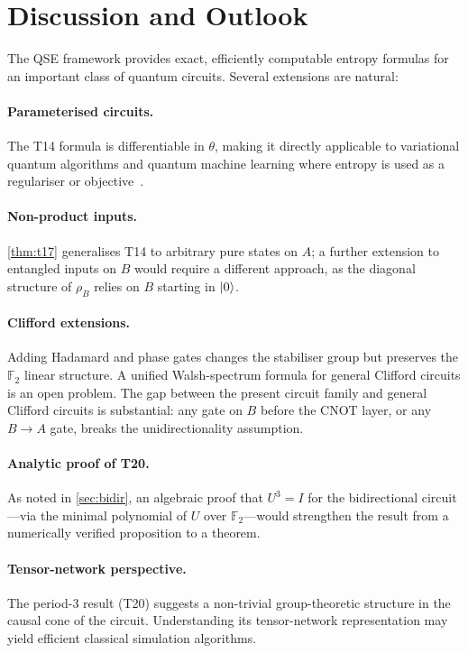 \documentclass[11pt,a4paper]{article}
\newcommand{\F}{\mathbb{F}}
\begin{document}
\section{Discussion and Outlook}
\label{sec:discussion}

The QSE framework provides exact, efficiently computable entropy formulas for
an important class of quantum circuits.  Several extensions are natural:

\paragraph{Parameterised circuits.}
The T14 formula is differentiable in $\theta$, making it directly applicable
to variational quantum algorithms and quantum machine learning where entropy
is used as a regulariser or objective~\cite{cerezo2021variational}.

\paragraph{Non-product inputs.}
\cref{thm:t17} generalises T14 to arbitrary pure states on $A$; a further
extension to entangled inputs on $B$ would require a different approach, as
the diagonal structure of $\rho_B$ relies on $B$ starting in $\ket{0}$.

\paragraph{Clifford extensions.}
Adding Hadamard and phase gates changes the stabiliser group but preserves
the $\F_2$ linear structure.  A unified Walsh-spectrum formula for general
Clifford circuits is an open problem.  The gap between the present circuit
family and general Clifford circuits is substantial: any gate on $B$ before
the CNOT layer, or any $B \to A$ gate, breaks the unidirectionality assumption.

\paragraph{Analytic proof of T20.}
As noted in \cref{sec:bidir}, an algebraic proof that $U^3 = I$ for the
bidirectional circuit---via the minimal polynomial of $U$ over $\F_2$---would
strengthen the result from a numerically verified proposition to a theorem.

\paragraph{Tensor-network perspective.}
The period-3 result (T20) suggests a non-trivial group-theoretic structure
in the causal cone of the circuit.  Understanding its tensor-network
representation may yield efficient classical simulation algorithms.
\end{document}
